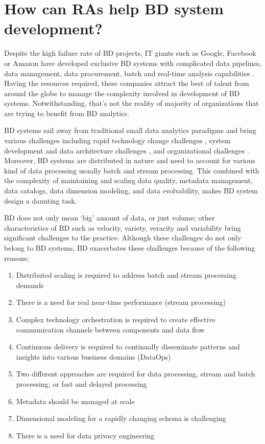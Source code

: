 \documentclass{ieeeaccess}
\begin{document}
\section{How can RAs help BD system development? }

Despite the high failure rate of BD projects, IT giants such as Google, Facebook or Amazon have developed exclusive BD systems with complicated data pipelines, data management, data procurement, batch and real-time analysis capabilities \cite{kohler2019towards}. Having the resources required, these companies attract the best of talent from around the globe to manage the complexity involved in development of BD systems. Notwithstanding, that’s not the reality of majority of organizations that are trying to benefit from BD analytics. 

BD systems sail away from traditional small data analytics paradigms and bring various challenges including rapid technology change challenges \cite{chen2017big}, system development and data architecture challenges \cite{jagadish2014big}, and organizational challenges \cite{AtaeiHype}. Moreover, BD systems are distributed in nature and need to account for various kind of data processing usually batch and stream processing. This combined with the complexity of maintaining and scaling data quality, metadata management, data catalogs, data dimension modeling, and data evolvability, makes BD system design a daunting task. 

BD does not only mean ‘big’ amount of data, or just volume; other characteristics of BD such as velocity, variety, veracity and variability bring significant challenges to the practice. Although these challenges do not only belong to BD systems, BD exacerbates these challenges because of the following reasons;

\begin{enumerate}
    \item Distributed scaling is required to address batch and stream processing demands
    \item There is a need for real near-time performance (stream processing) 
    \item Complex technology orchestration is required to create effective communication channels between components and data flow
    \item Continuous delivery is required to continually disseminate patterns and insights into various business domains (DataOps)
    \item Two different approaches are required for data processing, stream and batch processing; or fast and delayed processing 
    \item Metadata should be managed at scale 
    \item Dimensional modeling for a rapidly changing schema is challenging 
    \item There is a need for data privacy engineering
\end{enumerate}
\end{document}
